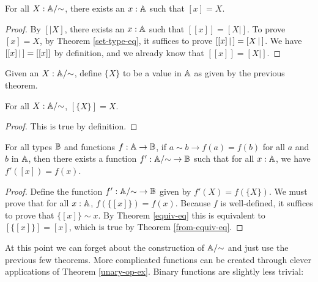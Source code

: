 \documentclass[../math.tex]{subfiles}
\begin{document}
\begin{theorem}
    For all $X : \mathbb{A}/{\sim}$, there exists an $x : \mathbb{A}$ such that $[x] = X$.
\end{theorem}
\begin{proof}
    By $[|X]$, there exists an $x : \mathbb{A}$ such that $[ [x]] = [X|]$.  To prove
    $[x] = X$, by Theorem \ref{set-type-eq}, it suffices to prove $[ [x]\, |\,] =
    [ X\, |\,]$.  We have $[ [x]\, |\,] = [ [x]]$ by definition, and we already know
    that $[ [x]] = [X|]$.
\end{proof}

\begin{definition}
    Given an $X : \mathbb{A}/{\sim}$, define $\{X\}$ to be a value in $\mathbb{A}$ as given by
    the previous theorem.
\end{definition}

\begin{theorem} \label{from-equiv-eq}
    For all $X : \mathbb{A}/{\sim}$, $[\{X\}] = X$.
\end{theorem}
\begin{proof}
    This is true by definition.
\end{proof}

\begin{theorem} \label{unary-op-ex}
    For all types $\mathbb{B}$ and functions $f : \mathbb{A} \to \mathbb{B}$, if $a \sim b \to f(a) =
    f(b)$ for all $a$ and $b$ in $\mathbb{A}$, then there exists a function $f' :
    \mathbb{A}/{\sim} \to \mathbb{B}$ such that for all $x : \mathbb{A}$, we have $f'([x]) = f(x)$.
\end{theorem}
\begin{proof}
    Define the function $f' : \mathbb{A}/{\sim} \to \mathbb{B}$ given by $f'(X) = f(\{X\})$.  We
    must prove that for all $x : \mathbb{A}$, $f(\{[x]\}) = f(x)$.  Because $f$ is
    well-defined, it suffices to prove that $\{[x]\} \sim x$.  By Theorem
    \ref{equiv-eq} this is equivalent to $[\{[x]\}] = [x]$, which is true by
    Theorem \ref{from-equiv-eq}.
\end{proof}

At this point we can forget about the construction of $\mathbb{A}/{\sim}$ and just use
the previous few theorems.  More complicated functions can be created through
clever applications of Theorem \ref{unary-op-ex}.  Binary functions are slightly
less trivial:
\end{document}
